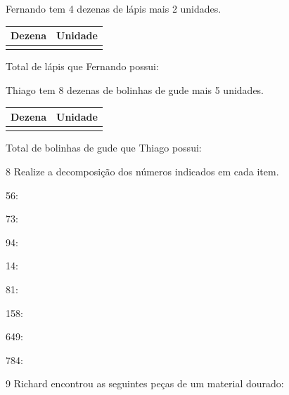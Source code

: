 \begin{escolha}

\item
  Fernando tem 4 dezenas de lápis mais 2 unidades.

\begin{longtable}[]{@{}ll@{}}
\toprule
Dezena & Unidade\tabularnewline
\midrule
\endhead
&\tabularnewline
\bottomrule
\end{longtable}

Total de lápis que Fernando possui:


\item Thiago tem 8 dezenas de bolinhas de gude mais 5 unidades.

\begin{longtable}[]{@{}ll@{}}
\toprule
Dezena & Unidade\tabularnewline
\midrule
\endhead
&\tabularnewline
\bottomrule
\end{longtable}

Total de bolinhas de gude que Thiago possui:

\end{escolha}

\num{8} Realize a decomposição dos números indicados em cada item.

\begin{escolha}
\item 56: 

\item 73: 

\item 94: 

\item 14: 

\item 81: 

\item 158: 

\item 649: 

\item 784: 
\end{escolha}

\num{9} Richard encontrou as seguintes peças de um material dourado:


